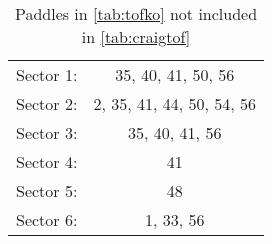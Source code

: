\begin{table}
\begin{minipage}{\textwidth}
\begin{center}
\begin{singlespacing}

\caption{\label{tab:diff}Paddles in \ref{tab:tofko} not included in \ref{tab:craigtof}}

\begin{tabular}{lc}

\hline \hline

Sector 1: & 35, 40, 41, 50, 56 \\
Sector 2: & 2, 35, 41, 44, 50, 54, 56 \\
Sector 3: & 35, 40, 41, 56 \\
Sector 4: & 41 \\
Sector 5: & 48 \\
Sector 6: & 1, 33, 56 \\

\hline \hline

\end{tabular}

\end{singlespacing}
\end{center}
\end{minipage}
\end{table}
